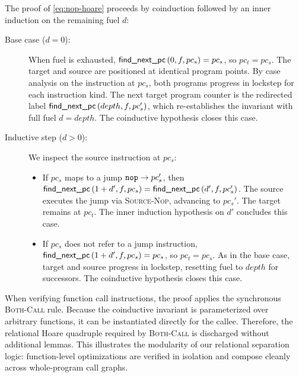 \documentclass[report.tex]{subfiles}
\begin{document}
The proof of \cref{eq:nop-hoare} proceeds by coinduction
followed by an inner induction on the remaining fuel $d$:
\begin{description}
  \item[Base case ($d = 0$):]
        When fuel is exhausted,
        $\textsf{find\_next\_pc}\left(0, f, pc_s\right) = pc_s$,
        so $pc_t = pc_s$.
        The target and source are positioned at identical program points.
        By case analysis on the instruction at $pc_s$,
        both programs progress in lockstep for each instruction kind.
        The next target program counter is the redirected label
        $\textsf{find\_next\_pc}\left(depth, f, pc_s'\right)$,
        which re-establishes the invariant with full fuel $d = depth$.
        The coinductive hypothesis closes this case.

  \item[Inductive step ($d > 0$):]
        We inspect the source instruction at $pc_s$:
        \begin{itemize}
          \item If $pc_s$ maps to a jump $\mathtt{nop} \to pc_s'$,
                then $\textsf{find\_next\_pc}\left(1 + d', f, pc_s\right) =
                \textsf{find\_next\_pc}\left(d', f, pc_s'\right)$.
                The source executes the jump via \textsc{Source-Nop},
                advancing to $pc_s'$.
                The target remains at $pc_t$.
                The inner induction hypothesis on $d'$ concludes this case.

          \item If $pc_s$ does not refer to a jump instruction,
                $\textsf{find\_next\_pc}\left(1 + d', f, pc_s\right) = pc_s$,
                so $pc_t = pc_s$.
                As in the base case,
                target and source progress in lockstep,
                resetting fuel to $depth$ for successors.
                The coinductive hypothesis closes this case.
        \end{itemize}
\end{description}

When verifying function call instructions,
the proof applies the synchronous \textsc{Both-Call} rule.
Because the coinductive invariant is parameterized
over arbitrary \muRTL{} functions,
it can be instantiated directly for the callee.
Therefore,
the relational Hoare quadruple required by \textsc{Both-Call}
is discharged without additional lemmas.
This illustrates the modularity of our relational separation logic:
function-level optimizations are verified in isolation
and compose cleanly across whole-program call graphs.
\end{document}
